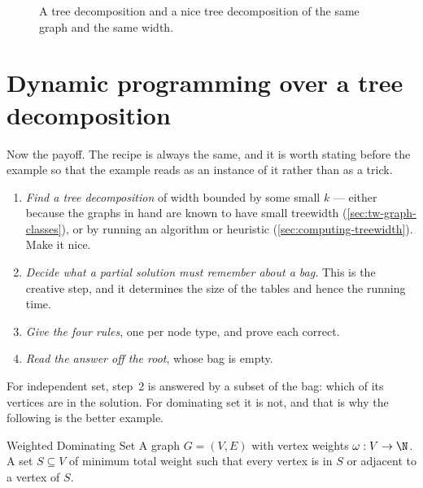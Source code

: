 \begin{figure}[ht]
\centering
{}
\caption{A tree decomposition and a nice tree decomposition of the same graph
and the same width.}
\label{fig:tw-nice}
\end{figure}

\section{Dynamic programming over a tree decomposition}
\label{sec:tw-dp}

Now the payoff. The recipe is always the same, and it is worth stating before
the example so that the example reads as an instance of it rather than as a
trick.

\begin{enumerate}[leftmargin=*]
  \item \emph{Find a tree decomposition} of width bounded by some small $k$ ---
        either because the graphs in hand are known to have small treewidth
        (\cref{sec:tw-graph-classes}), or by running an algorithm or heuristic
        (\cref{sec:computing-treewidth}). Make it nice.
  \item \emph{Decide what a partial solution must remember about a bag.} This
        is the creative step, and it determines the size of the tables and
        hence the running time.
  \item \emph{Give the four rules}, one per node type, and prove each correct.
  \item \emph{Read the answer off the root}, whose bag is empty.
\end{enumerate}

For independent set, step~2 is answered by a subset of the bag: which of its
vertices are in the solution. For dominating set it is not, and that is why the
following is the better example.

\begin{probdef}{Weighted Dominating Set}
  \instance A graph $G = (V,E)$ with vertex weights $\omega : V \to \N$.
  \question A set $S \subseteq V$ of minimum total weight such that every
  vertex is in $S$ or adjacent to a vertex of $S$.
\end{probdef}


